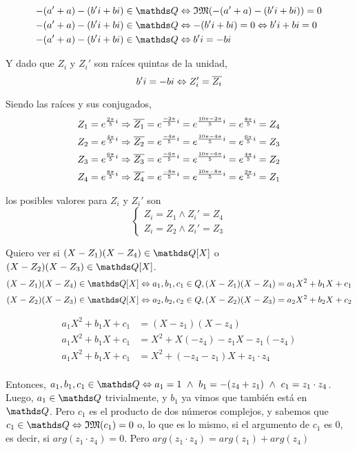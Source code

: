 \documentclass[a4paper,spanish]{article}
\begin{document}
  \begin{align*}
    -(a'+a) -(b'i+bi) \in \Q &\iif \mathfrak{IM}(-(a'+a) -(b'i+bi)) = 0 \\
    -(a'+a) -(b'i+bi) \in \Q &\iif -(b'i+bi) = 0 \iif b'i + bi = 0 \\
    -(a'+a) -(b'i+bi) \in \Q &\iif b'i = -bi
  \end{align*}

  Y dado que $Z_i$ y $Z_i'$ son raíces quintas de la unidad,
  \[
    b'i = -bi \Leftrightarrow Z_i' = \overline{Z_i}
  \]

  Siendo las raíces y sus conjugados,
  \begin{align*}
    Z_1 = e^{\frac{2\pi}{5}i} \Rightarrow \overline{Z_1} = e^{\frac{-2\pi}{5}i}
      = e^{\frac{10\pi-2\pi}{5}i} = e^{\frac{8\pi}{5}i} = Z_4 \\
    Z_2 = e^{\frac{4\pi}{5}i} \Rightarrow \overline{Z_2} = e^{\frac{-4\pi}{5}i}
      = e^{\frac{10\pi-4\pi}{5}i} = e^{\frac{6\pi}{5}i} = Z_3 \\
    Z_3 = e^{\frac{6\pi}{5}i} \Rightarrow \overline{Z_3} = e^{\frac{-6\pi}{5}i}
      = e^{\frac{10\pi-6\pi}{5}i} = e^{\frac{4\pi}{5}i} = Z_2 \\
    Z_4 = e^{\frac{8\pi}{5}i} \Rightarrow \overline{Z_4} = e^{\frac{-8\pi}{5}i}
      = e^{\frac{10\pi-8\pi}{5}i} = e^{\frac{2\pi}{5}i} = Z_1 \\
  \end{align*}

  los posibles valores para $Z_i$ y $Z_i'$ son
  \[\begin{cases}
    Z_i = Z_1 \land Z_i' = Z_4 \\
    Z_i = Z_2 \land Z_i' = Z_3
  \end{cases}\]

  Quiero ver si $(X-Z_1)(X-Z_4) \in \Q[X]$ o $(X-Z_2)(X-Z_3) \in \Q[X]$.
  \[
    (X-Z_1)(X-Z_4) \in \Q[X] \iif a_1,b_1,c_1 \in Q, (X-Z_1)(X-Z_4)=a_1X^2+b_1X+c_1
  \]
  \[
    (X-Z_2)(X-Z_3) \in \Q[X] \iif a_2,b_2,c_2 \in Q, (X-Z_2)(X-Z_3)=a_2X^2+b_2X+c_2
  \]

  \begin{align*}
    a_1X^2+b_1X+c_1&=(X-z_1)(X-z_4) \\
    a_1X^2+b_1X+c_1&=X^2+X(-z_4)-z_1X-z_1(-z_4) \\
    a_1X^2+b_1X+c_1&=X^2+ (-z_4-z_1)X + z_1 \cdot z_4 \\
  \end{align*}

  Entonces, $a_1,b_1,c_1 \in \Q 
  \iif a_1 = 1 ~\land~ b_1 = -(z_4+z_1) ~\land~ c_1 = z_1 \cdot z_4$. 
  Luego, $a_1 \in \Q$ trivialmente, y $b_1$ ya vimos que también está en $\Q$. 
  Pero $c_1$ es el producto de dos números complejos, y sabemos que 
  $c_1 \in \Q \iif \mathfrak{IM}(c_1) = 0$ o, lo que es lo mismo, si el 
  argumento de $c_1$ es $0$, es decir, si $arg(z_1 \cdot z_4)=0$.
  Pero $arg(z_1 \cdot z_4) = arg(z_1) + arg(z_4)$
\end{document}
